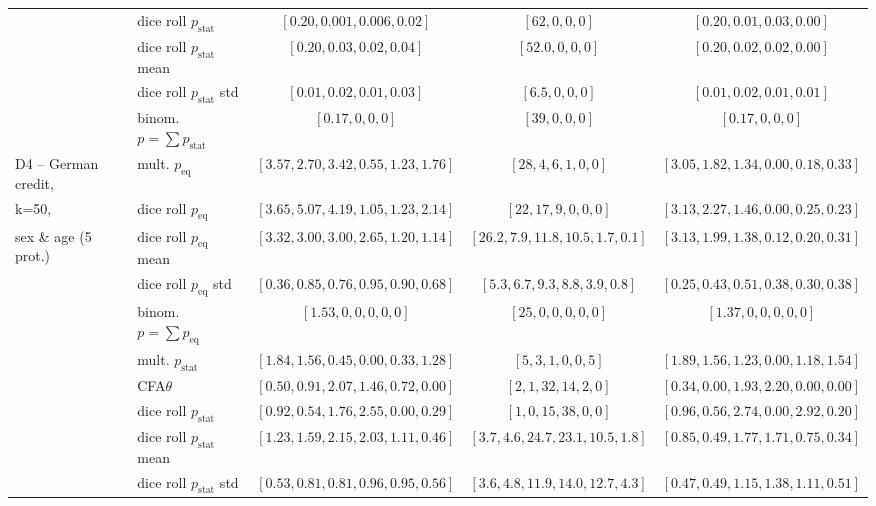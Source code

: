 \begin{table}[t!]
{\begin{tabular}{llccc}
								& dice roll $p_{\text{stat}}$ 	& $[0.20, 0.001, 0.006, 0.02]$ & $[62, 0, 0, 0]$ 		& $[0.20, 0.01, 0.03, 0.00]$ \\
								& dice roll $p_{\text{stat}}$ mean	& $[0.20, 0.03, 0.02, 0.04]$ & $[52.0, 0, 0, 0]$ 		& $[0.20, 0.02, 0.02, 0.00]$ \\
								& dice roll $p_{\text{stat}}$ std	& $[0.01, 0.02, 0.01, 0.03]$ & $[6.5, 0, 0, 0]$ 		& $[0.01, 0.02, 0.01, 0.01]$ \\
								& binom. \algoFAIR $p = \sum p_{\text{stat}}$	& $[0.17,0,0, 0]$		& $[39,0,0, 0]$		& $[0.17,0,0, 0]$  \\												
			\midrule
			\midrule
			D4 -- German credit, 	& mult. \algoFAIR $p_{\text{eq}}$ 	&  $[3.57, 2.70, 3.42, 0.55, 1.23, 1.76]$ 	& $[28, 4, 6, 1, 0, 0]$ 	& $[3.05, 1.82, 1.34, 0.00, 0.18, 0.33]$ \\
			k=50,					& dice roll $p_{\text{eq}}$ 	& $[3.65, 5.07, 4.19, 1.05, 1.23, 2.14]$ & $[22, 17, 9, 0, 0, 0]$ 	& $[3.13, 2.27, 1.46, 0.00, 0.25, 0.23]$ \\
			sex \& age (5 prot.)	& dice roll $p_{\text{eq}}$ mean	& $[3.32, 3.00, 3.00, 2.65, 1.20, 1.14]$ & $[26.2, 7.9, 11.8, 10.5, 1.7, 0.1]$ 	& $[3.13, 1.99, 1.38, 0.12, 0.20, 0.31]$ \\
									& dice roll $p_{\text{eq}}$ std	& $[0.36, 0.85, 0.76, 0.95, 0.90, 0.68]$ & $[5.3, 6.7, 9.3, 8.8, 3.9, 0.8]$ 	& $[0.25, 0.43, 0.51, 0.38, 0.30, 0.38]$ \\
								& binom. \algoFAIR $p = \sum p_{\text{eq}}$	& $[1.53,0,0, 0,0,0]$		& $[25,0,0, 0,0,0]$		& $[1.37,0,0, 0,0,0]$  \\
									\cline{2-5}
									& mult. \algoFAIR $p_{\text{stat}}$ & $[1.84, 1.56, 0.45, 0.00, 0.33, 1.28]$ & $[5, 3, 1, 0, 0, 5]$ & $[1.89, 1.56, 1.23, 0.00, 1.18, 1.54]$  \\
									& CFA$\theta$ &  $[0.50, 0.91, 2.07, 1.46, 0.72, 0.00]$ & $[2, 1, 32, 14, 2, 0]$ & $[0.34, 0.00, 1.93, 2.20, 0.00, 0.00]$ \\
									& dice roll $p_{\text{stat}}$ 	& $[0.92, 0.54, 1.76, 2.55, 0.00, 0.29]$ & $[1, 0, 15, 38, 0, 0]$ 		& $[0.96, 0.56, 2.74, 0.00, 2.92, 0.20]$ \\
									& dice roll $p_{\text{stat}}$ mean	& $[1.23, 1.59, 2.15, 2.03, 1.11, 0.46]$ & $[3.7, 4.6, 24.7, 23.1, 10.5, 1.8]$ 		& $[0.85, 0.49, 1.77, 1.71, 0.75, 0.34]$ \\
									& dice roll $p_{\text{stat}}$ std	& $[0.53, 0.81, 0.81, 0.96, 0.95, 0.56]$ & $[3.6, 4.8, 11.9, 14.0, 12.7, 4.3]$ 		& $[0.47, 0.49, 1.15, 1.38, 1.11, 0.51]$ \\

\end{tabular}}
\end{table}
